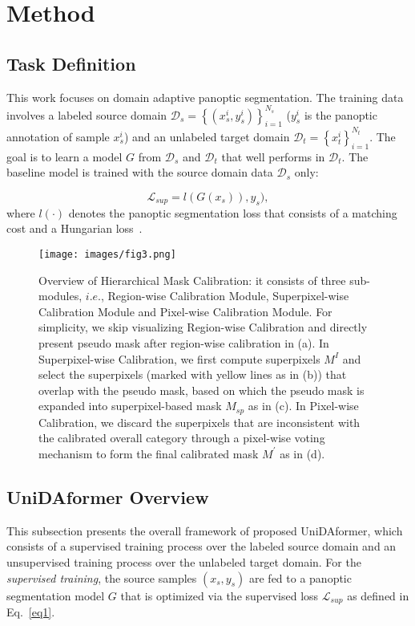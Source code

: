 \documentclass[10pt,twocolumn,letterpaper]{article}
\begin{document}
\section{Method}

\subsection{Task Definition}
This work focuses on domain adaptive panoptic segmentation. The training data involves a labeled source domain $\mathcal{D}_s=\left\{(x_{s}^{{i}}, y_{s}^{{i}})\right\}_{i=1}^{N_{{s}}}$ ($y_s^i$ is the panoptic annotation of sample {$x_s^i$}) and an unlabeled target domain $\mathcal{D}_t = \left\{x_{t}^{{i}}\right\}_{i=1}^{N_{{t}}}$. The goal is to learn a model $G$ from $\mathcal{D}_s$ and $\mathcal{D}_t$ that well performs in $\mathcal{D}_t $. The baseline model is trained with the source domain data $\mathcal{D}_s$ only:

\begin{equation}
\label{eq1}
\mathcal{L}_{sup}=l(G(x_s)), y_s),
\end{equation}
where $l(\cdot)$ denotes the panoptic segmentation loss that consists of a matching cost and a Hungarian loss~\cite{carion2020detr}.

\begin{figure*}[t]
\centering
\texttt{[image: images/fig3.png]}
\caption{
Overview of Hierarchical Mask Calibration:
it consists of three sub-modules, $i.e.$, Region-wise Calibration Module, Superpixel-wise Calibration Module and Pixel-wise Calibration Module. 
For simplicity, we skip visualizing Region-wise Calibration and directly present pseudo mask after region-wise calibration in (a).
In Superpixel-wise Calibration, we first compute superpixels $M^I$ and select the superpixels (marked with yellow lines as in (b)) that overlap with the pseudo mask, based on which the pseudo mask is expanded into superpixel-based mask $M_{sp}$ as in (c). In Pixel-wise Calibration, we discard the superpixels that are inconsistent with the calibrated overall category through a pixel-wise voting mechanism to form the final calibrated mask $M^{'}$ as in (d).
}
\label{fig:shape}
\end{figure*}

\subsection{UniDAformer Overview}

This subsection presents the overall framework of proposed UniDAformer, which consists of a supervised training process over the labeled source domain and an unsupervised training process over the unlabeled target domain. 
For the \textit{supervised training}, the source samples $(x_s, y_s)$ are fed to a panoptic segmentation model $G$ that is optimized via the supervised loss $\mathcal{L}_{sup}$ as defined in Eq.~\ref{eq1}.
\end{document}
